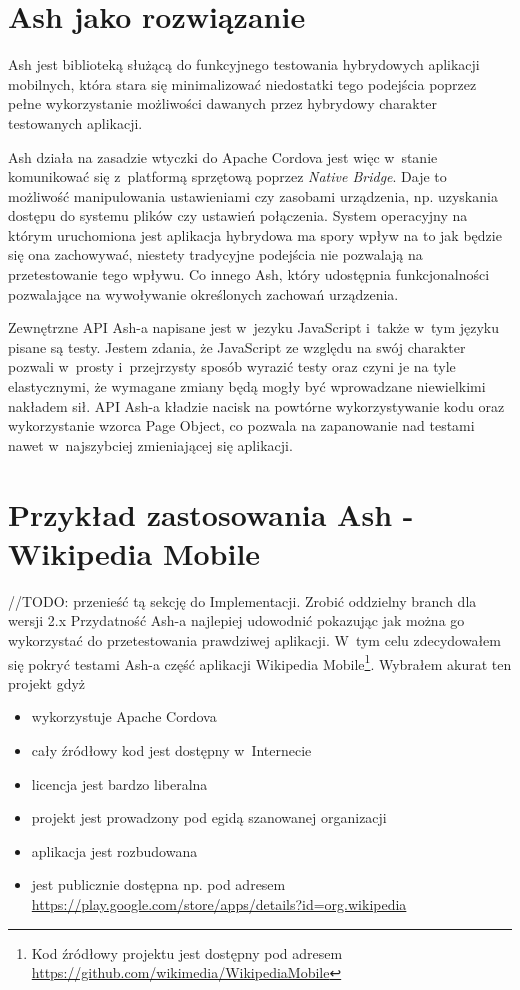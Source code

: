 \documentclass[brudnopis]{xmgr}
\begin{document}
                                                                                                                                                                 
\section{Ash jako rozwiązanie}

Ash jest biblioteką służącą do funkcyjnego testowania hybrydowych aplikacji mobilnych, która stara się minimalizować niedostatki tego podejścia poprzez pełne wykorzystanie możliwości dawanych przez hybrydowy charakter testowanych aplikacji. 

Ash działa na zasadzie wtyczki do Apache Cordova jest więc w~stanie komunikować się z~platformą sprzętową poprzez \textit{Native Bridge}. Daje to możliwość manipulowania ustawieniami czy zasobami urządzenia, np. uzyskania dostępu do systemu plików czy ustawień połączenia. System operacyjny na którym uruchomiona jest aplikacja hybrydowa ma spory wpływ na to jak będzie się ona zachowywać, niestety tradycyjne podejścia nie pozwalają na przetestowanie tego wpływu. Co innego Ash, który udostępnia funkcjonalności pozwalające na wywoływanie określonych zachowań urządzenia. 

Zewnętrzne API Ash-a napisane jest w~jezyku JavaScript i~także w~tym języku pisane są testy. Jestem zdania, że JavaScript ze względu na swój charakter pozwali w~prosty i~przejrzysty sposób wyrazić testy oraz czyni je na tyle elastycznymi, że wymagane zmiany będą mogły być wprowadzane niewielkimi nakładem sił. API Ash-a kładzie nacisk na powtórne wykorzystywanie kodu oraz wykorzystanie wzorca Page Object, co pozwala na zapanowanie nad testami nawet w~najszybciej zmieniającej się aplikacji. 

\section{Przykład zastosowania Ash - Wikipedia Mobile}

//TODO: przenieść tą sekcję do Implementacji. Zrobić oddzielny branch dla wersji 2.x
Przydatność Ash-a najlepiej udowodnić pokazując jak można go wykorzystać do przetestowania prawdziwej aplikacji. W~tym celu zdecydowałem się pokryć testami Ash-a część aplikacji Wikipedia Mobile\footnote{Kod źródłowy projektu jest dostępny pod adresem \url{https://github.com/wikimedia/WikipediaMobile} }. Wybrałem akurat ten projekt gdyż

\begin{itemize}
  \item wykorzystuje Apache Cordova
  \item cały źródłowy kod jest dostępny w~Internecie
  \item licencja jest bardzo liberalna
  \item projekt jest prowadzony pod egidą szanowanej organizacji
  \item aplikacja jest rozbudowana
  \item jest publicznie dostępna np. pod adresem \url{https://play.google.com/store/apps/details?id=org.wikipedia}
\end{itemize}
\end{document}
